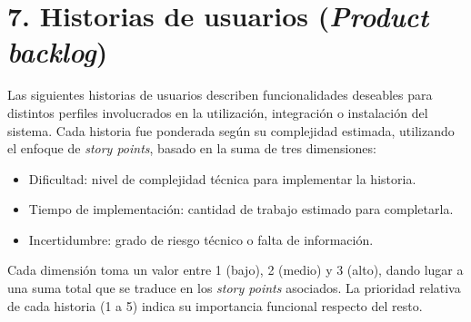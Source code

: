 \documentclass[
11pt, %
]{charter}
\begin{document}
\section{7. Historias de usuarios (\textit{Product backlog})}
\label{sec:backlog}

Las siguientes historias de usuarios describen funcionalidades deseables para distintos perfiles involucrados en la utilización, integración o instalación del sistema. Cada historia fue ponderada según su complejidad estimada, utilizando el enfoque de \textit{story points}, basado en la suma de tres dimensiones:

\begin{itemize}
	\item Dificultad: nivel de complejidad técnica para implementar la historia.
	\item Tiempo de implementación: cantidad de trabajo estimado para completarla.
	\item Incertidumbre: grado de riesgo técnico o falta de información.
\end{itemize}

Cada dimensión toma un valor entre 1 (bajo), 2 (medio) y 3 (alto), dando lugar a una suma total que se traduce en los \textit{story points} asociados. La prioridad relativa de cada historia (1 a 5) indica su importancia funcional respecto del resto.
\end{document}
